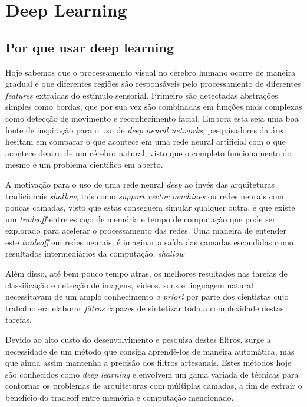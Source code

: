 
\section{Deep Learning}

\subsection{Por que usar deep learning}

Hoje sabemos\citet{hubel1959receptive} que o processamento visual no cérebro
humano ocorre de maneira gradual e que diferentes regiões são responsáveis pelo
processamento de diferentes \emph{features} extraídas do estímulo sensorial.
Primeiro são detectadas abstrações simples como bordas, que por sua vez são
combinadas em funções mais complexas como detecção de movimento e
reconhecimento facial. Embora esta seja uma boa fonte de inspiração para o uso
de \emph{deep neural networks}, pesquisadores da área hesitam em comparar o que
acontece em uma rede neural artificial com o que acontece dentro de um cérebro
natural, visto que o completo funcionamento do mesmo é um problema científico
em aberto.

A motivação para o uso de uma rede neural \emph{deep} ao invés das arquiteturas
tradicionais \emph{shallow}, tais como \emph{support vector machines} ou redes
neurais com poucas camadas, visto que estas conseguem simular qualquer outra, é
que existe um \emph{tradeoff} entre espaço de memória e tempo de computação que
pode ser explorado para acelerar o processamento das redes.  Uma maneira de
entender este \emph{tradeoff} em redes neurais, é imaginar a saída das camadas
escondidas como resultados intermediários da computação.
\emph{shallow}\cite{bengio2007scaling}

Além disso, até bem pouco tempo atras, os melhores resultados nas tarefas de
classificação e detecção de imagens, videos, sons e linguagem natural
necessitavam de um amplo conhecimento \emph{a priori} por parte dos cientistas
cujo trabalho era elaborar \emph{filtros} capazes de sintetizar toda a
complexidade destas tarefas.

Devido ao alto custo do desenvolvimento e pesquisa destes filtros, surge a
necessidade de um método que consiga aprendê-los de maneira automática, mas que
ainda assim mantenha a precisão dos filtros artesanais. Estes métodos hoje são
conhecidos como \emph{deep learning} e envolvem um gama variada de técnicas
para contornar os problemas de arquiteturas com múltiplas camadas, a fim de
extrair o benefício do tradeoff entre memória e computação mencionado.


